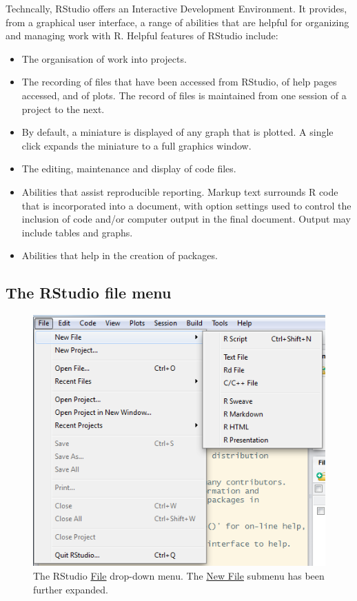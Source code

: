 \documentclass{tufte-book}\usepackage[]{graphicx}\usepackage[]{color}
\begin{document}
Techncally, 
RStudio offers an Interactive Development Environment.  It
provides, from a graphical user interface, a range of abilities that
are helpful for organizing and managing work with R.  Helpful features
of RStudio include:
\begin{itemize}
\item The organisation of work into projects.
\item The recording of files that have been accessed from RStudio, of
  help pages accessed, and of plots.  The record of files is
  maintained from one session of a project to the next.
\item By default, a miniature is displayed of any graph that is
  plotted.  A single click expands the miniature to a full graphics
  window.
\item The editing, maintenance and display of code files.
\item Abilities that assist reproducible reporting.
     Markup text
  surrounds R code that is incorporated into a document, with option
  settings used to control the inclusion of code and/or computer
  output in the final document. Output may include tables and graphs.
\item Abilities that help in the creation of packages.
\end{itemize}

\subsection{The RStudio file menu}

\begin{figure}
\includegraphics{figs-inc/03i-menu.png}
\caption{The RStudio \underline{File} drop-down menu.  The
  \underline{New File} submenu has been further expanded.}\label{fig:file-menu}
\end{figure}
\end{document}
